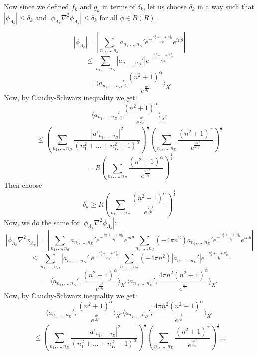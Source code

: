 \documentclass{article}
\theoremstyle{definition}
\begin{document}
Now since we defined $f_k$ and $g_k$ in terms of $\delta_k$, let us choose $\delta_k$ in a way such that $|\phi_{\Lambda_k}| \leq \delta_k$ and $|\phi_{\Lambda_k} \nabla^2 \phi_{\Lambda_k}| \leq \delta_k$ for all $\phi \in B(R)$.


\[
|\phi_{\Lambda_k}| = \left|\sum_{n_1,\ldots,n_d} a_{n_1,\ldots,n_D}'e^{-\frac{n_1^2+\ldots+n_D^2}{\Lambda_k}}e^{in\theta}\right|
\]
\[
\leq \sum_{n_1,\ldots,n_D} |a_{n_1,\ldots,n_D}'|e^{-\frac{n_1^2+\ldots+n_D^2}{\Lambda_k}}
\]
\[
= \langle a_{n_1,\ldots,n_D}', \frac{(n^2+1)^\alpha}{e^{\frac{n^2}{\Lambda_k}}}\rangle_{X^*}
\]
Now, by Cauchy-Schwarz inequality we get:
\[
 \langle a_{n_1,\ldots,n_D}', \frac{(n^2+1)^\alpha}{e^{\frac{n^2}{\Lambda_k}}}\rangle_{X^*}
\]
\[
\leq \left(\sum_{n_1,..., n_D} \frac{\left|{a'_{n_1,..., n_D}}\right|^2}{(n_1^2 +...+ n_D^2 + 1)^{\alpha}} \right)^{\frac{1}{2}} \left( \sum_{n_1,\ldots,n_D}\frac{(n^2+1)^\alpha}{e^{\frac{2n^2}{\Lambda_k}}} \right)^{\frac{1}{2}}
\]
\[
=R\left( \sum_{n_1,\ldots,n_D}\frac{(n^2+1)^\alpha}{e^{\frac{2n^2}{\Lambda_k}}} \right)^{\frac{1}{2}}
\]
Then choose
\[
\delta_k \geq R\left( \sum_{n_1,\ldots,n_D}\frac{(n^2+1)^\alpha}{e^{\frac{2n^2}{\Lambda_k}}} \right)^{\frac{1}{2}}
\]
Now, we do the same for $|\phi_{\Lambda_k} \nabla^2 \phi_{\Lambda_k}|$:
\[
|\phi_{\Lambda_k} \nabla^2 \phi_{\Lambda_k}| = \left|\sum_{n_1,\ldots,n_d} a_{n_1,\ldots,n_D}'e^{-\frac{n_1^2+\ldots+n_D^2}{\Lambda_k}}e^{in\theta}\sum_{n_1,\ldots,n_d} (-4\pi n^2)a_{n_1,\ldots,n_D}'e^{-\frac{n_1^2+\ldots+n_D^2}{\Lambda_k}}e^{in\theta}\right|
\]
\[
\leq \sum_{n_1,\ldots,n_D} |a_{n_1,\ldots,n_D}'|e^{-\frac{n_1^2+\ldots+n_D^2}{\Lambda_k}}\sum_{n_1,\ldots,n_d} (-4\pi n^2)\left|a_{n_1,\ldots,n_D}'\right|e^{-\frac{n_1^2+\ldots+n_D^2}{\Lambda_k}}
\]
\[
= \langle a_{n_1,\ldots,n_D}', \frac{(n^2+1)^\alpha}{e^{\frac{n^2}{\Lambda_k}}}\rangle_{X^*}\langle a_{n_1,\ldots,n_D}', \frac{4\pi n^2(n^2+1)^\alpha}{e^{\frac{n^2}{\Lambda_k}}}\rangle_{X^*}
\]
Now, by Cauchy-Schwarz inequality we get:
\[
 \langle a_{n_1,\ldots,n_D}', \frac{(n^2+1)^\alpha}{e^{\frac{n^2}{\Lambda_k}}}\rangle_{X^*} \langle a_{n_1,\ldots,n_D}', \frac{4\pi n^2(n^2+1)^\alpha}{e^{\frac{n^2}{\Lambda_k}}}\rangle_{X^*}
\]
\[
\leq \left(\sum_{n_1,..., n_D} \frac{\left|{a'_{n_1,..., n_D}}\right|^2}{(n_1^2 +...+ n_D^2 + 1)^{\alpha}} \right)^{\frac{1}{2}} \left( \sum_{n_1,\ldots,n_D}\frac{(n^2+1)^\alpha}{e^{\frac{2n^2}{\Lambda_k}}} \right)^{\frac{1}{2}} \ldots
\]
\end{document}
